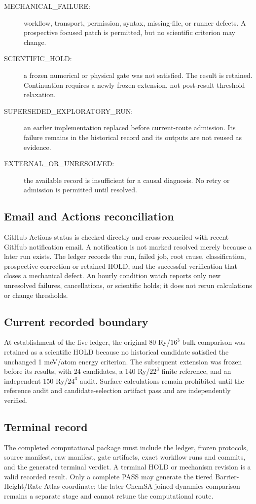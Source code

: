 \begin{description}
\item[MECHANICAL\_FAILURE:] workflow, transport, permission, syntax, missing-file,
or runner defects.  A prospective focused patch is permitted, but no scientific
criterion may change.
\item[SCIENTIFIC\_HOLD:] a frozen numerical or physical gate was not satisfied.
The result is retained.  Continuation requires a newly frozen extension, not
post-result threshold relaxation.
\item[SUPERSEDED\_EXPLORATORY\_RUN:] an earlier implementation replaced before
current-route admission.  Its failure remains in the historical record and its
outputs are not reused as evidence.
\item[EXTERNAL\_OR\_UNRESOLVED:] the available record is insufficient for a
causal diagnosis.  No retry or admission is permitted until resolved.
\end{description}

\subsection*{Email and Actions reconciliation}

GitHub Actions status is checked directly and cross-reconciled with recent
GitHub notification email.  A notification is not marked resolved merely because
a later run exists.  The ledger records the run, failed job, root cause,
classification, prospective correction or retained HOLD, and the successful
verification that closes a mechanical defect.  An hourly condition watch reports
only new unresolved failures, cancellations, or scientific holds; it does not
rerun calculations or change thresholds.

\subsection*{Current recorded boundary}

At establishment of the live ledger, the original 80 Ry/$16^3$ bulk comparison
was retained as a scientific HOLD because no historical candidate satisfied the
unchanged 1 meV/atom energy criterion.  The subsequent extension was frozen
before its results, with 24 candidates, a 140 Ry/$22^3$ finite reference, and an
independent 150 Ry/$24^3$ audit.  Surface calculations remain prohibited until
the reference audit and candidate-selection artifact pass and are independently
verified.

\subsection*{Terminal record}

The completed computational package must include the ledger, frozen protocols,
source manifest, raw manifest, gate artifacts, exact workflow runs and commits,
and the generated terminal verdict.  A terminal HOLD or mechanism revision is a
valid recorded result.  Only a complete PASS may generate the tiered
Barrier-Height/Rate Atlas coordinate; the later ChemSA joined-dynamics comparison
remains a separate stage and cannot retune the computational route.
